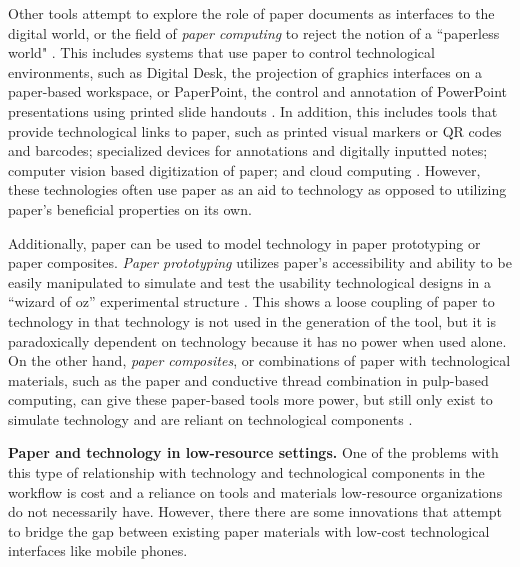 \documentclass{sig-alternate}
\begin{document}
Other tools attempt to explore the role of paper documents as interfaces to the digital world, or the field of \emph{paper computing} to reject the notion of a ``paperless world" \cite{kaplan2010}. This includes systems that use paper to control technological environments, such as Digital Desk, the projection of graphics interfaces on a paper-based workspace, or PaperPoint, the control and annotation of PowerPoint presentations using printed slide handouts \cite{newman1992,wellner1993,signer2007}. In addition, this includes tools that provide technological links to paper, such as printed visual markers or QR codes and barcodes; specialized devices for annotations and digitally inputted notes; computer vision based digitization of paper; and cloud computing \cite{kaplan2010,anoto,pietrzak2010}. However, these technologies often use paper as an aid to technology as opposed to utilizing paper's beneficial properties on its own. 

Additionally, paper can be used to model technology in paper prototyping or paper composites. \emph{Paper prototyping} utilizes paper's accessibility and ability to be easily manipulated to simulate and test the usability technological designs in a ``wizard of oz'' experimental structure \cite{synder2001,chandler2002}. This shows a loose coupling of paper to technology in that technology is not used in the generation of the tool, but it is paradoxically dependent on technology because it has no power when used alone. On the other hand, \emph{paper composites}, or combinations of paper with technological materials, such as the paper and conductive thread combination in pulp-based computing, can give these paper-based tools more power, but still only exist to simulate technology and are reliant on technological components \cite{coelho2009}.

\textbf{Paper and technology in low-resource settings.} One of the problems with this type of relationship with technology and technological components in the workflow is cost and a reliance on tools and materials low-resource organizations do not necessarily have. However, there there are some innovations that attempt to bridge the gap between existing paper materials with low-cost technological interfaces like mobile phones.
\end{document}
